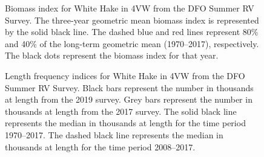 \documentclass[11pt]{book}
\begin{document}
\begin{figure}[htb]

{\centering {} 

}

\caption{Biomass index for White Hake in 4VW from the DFO Summer RV Survey. The three-year geometric mean biomass index is represented by the solid black line. The dashed blue and red lines represent 80\% and 40\% of the long-term geometric mean (1970--2017), respectively. The black dots represent the biomass index for that year.}\label{fig:23-fig-whitehake-biomass4VW}
\end{figure}

\begin{figure}[htb]

{\centering {} 

}

\caption{Length frequency indices for White Hake in 4VW from the DFO Summer RV Survey. Black bars represent the number in thousands at length from the 2019 survey. Grey bars represent the number in thousands at length from the 2017 survey. The solid black line represents the median in thousands at length for the time period 1970--2017. The dashed black line represents the median in thousands at length for the time period 2008--2017.}\label{fig:24-fig-whitehake-lengthfreq4VW}
\end{figure}
\end{document}
